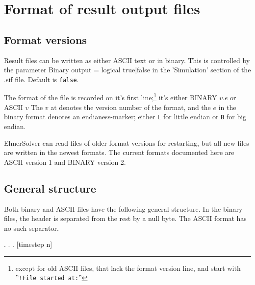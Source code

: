 \newcommand{\Str}[1]{<{#1}{\small\tt (str)}>}
\newcommand{\Int}[2]{<{#2}{\small\tt (i#1)}>}
\newcommand{\Dbl}[1]{<{#1}{\small\tt (dbl)}>}
\newcommand{\Perm}{\ensuremath{p}}
\newcommand{\nTime}{\ensuremath{\mathit{nt}}}
\newcommand{\nSaved}{\ensuremath{\mathit{ns}}}
\newcommand{\Time}{\ensuremath{t}}
\newcommand{\nPositive}{\ensuremath{\mathit{np}}}
\newcommand{\PermSize}{\ensuremath{\mathit{size}}}
\newcommand{\Pos}{\ensuremath{\mathit{Pos}}}
\newcommand{\nNodes}{\ensuremath{\mathit{nNodes}}}
\newcommand{\Var}{\ensuremath{\mathit{Var}}}

\chapter{Format of result output files}

\section{Format versions}

Result files can be written as either ASCII text or in binary. This is
controlled by the parameter 
\ttbegin
   Binary output = logical true|false
\ttend
in the 'Simulation' section of the .sif file.  Default is \texttt{false}.

The format of the file is recorded on it's first line;\footnote{except for
old ASCII files, that lack the format version line, and start with
''\texttt{!File started at:}''} it's either
\ttbegin
 BINARY \(v.e\)
\ttend
or
\ttbegin
 ASCII \(v\)
\ttend
The $v$ at denotes the version number of the format, and the $e$ in the
binary format denotes an endianess-marker; either \verb+L+ for little
endian or \verb+B+ for big endian.

ElmerSolver can read files of older format versions for restarting, but all
new files are written in the newest formats. The current formats documented
here are ASCII version 1 and BINARY version 2.

\section{General structure}
Both binary and ASCII files have the following general structure. In the
binary files, the header is separated from the rest by a null byte.  The
ASCII format has no such separator.

   .
   .
   .
[timestep n]
\ttend

